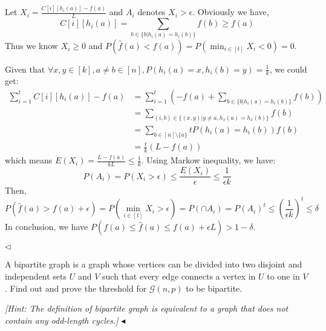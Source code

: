\documentclass[11pt]{article}
\newenvironment{problem}[2][Problem]{\begin{trivlist}
\item[\hskip \labelsep {\bfseries #1}\hskip \labelsep {\bfseries #2.}]}{\hfill$\blacktriangleleft$\end{trivlist}}
\newenvironment{answer}[1][Answer]{\begin{trivlist}
\item[\hskip \labelsep {\bfseries #1.}\hskip \labelsep]}{\hfill$\lhd$\end{trivlist}}
\begin{document}
\begin{answer}
    Let $X_i = \frac{C[i][h_i(a)]-f(a)}{L}$ and $A_i$ denotes $X_i>\epsilon$. Obviously we have,
$$C[i][h_i(a)]=\sum_{b\in\{b|h_i(a)=h_i(b)\}}f(b)\ge f(a)$$
Thus we know $X_i\ge 0$ and $P(\hat f(a)<f(a)) = P(\min_{i\in [t]} X_i<0)=0$.

    Given that $\forall x,y\in[k],a\neq b\in [n],P(h_i(a)=x,h_i(b)=y)=\frac{1}{k}$, we could get:
    $$\begin{align*}\sum_{i=1}^tC[i][h_i(a)]-f(a)&=\sum_{i=1}^t\left(-f(a)+\sum_{b\in\{b|h_i(a)=h_i(b)\}}f(b)\right)\\&=\sum_{(i,b)\in\{(x,y)|y\neq a,h_{x}(a)=h_x(b)\}}f(b)\\&=\sum_{b\in [n]\setminus\{a\}}tP(h_i(a)=h_i(b))f(b)\\&=\frac{t}{k}(L-f(a))\end{align*}$$
    which means $E(X_i) = \frac{L-f(a)}{kL}\leq \frac{1}{k}$. Using Markow inequality, we have:
    $$P(A_i)=P(X_i>\epsilon)\leq \frac{E(X_i)}{\epsilon}\leq \frac{1}{\epsilon k}$$
    Then,
    $$P(\hat f(a)>f(a)+\epsilon)=P(\min_{i\in [t]}X_i>\epsilon)=P(\cap A_i) = P(A_i)^t\leq \left(\frac{1}{\epsilon k}\right)^t\leq \delta$$
    In conclusion, we have $P(f(a)\leq\hat f(a)\leq f(a)+\epsilon L)>1-\delta$.
    
\end{answer}

\begin{problem}{2 (18')}
A bipartite graph is a graph whose vertices can be divided into two disjoint and independent sets $U$ and $V$ such that every edge connects a vertex in $U$ to one in $V$. Find out and prove the threshold for $\mathcal{G}(n,p)$ to be bipartite.

\textit{[Hint: The definition of bipartite graph is equivalent to a graph that does not contain any odd-length cycles.]}
\end{problem}
\end{document}
